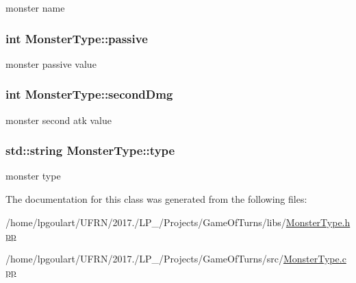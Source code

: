 monster name 

\subsubsection[{\texorpdfstring{passive}{passive}}]{\setlength{\rightskip}{0pt plus 5cm}int Monster\+Type\+::passive\hspace{0.3cm}{\ttfamily [private]}}\hypertarget{classMonsterType_a724fe4488d7b1f3e98acc95cd918d48b}{}\label{classMonsterType_a724fe4488d7b1f3e98acc95cd918d48b}


monster passive value 

\subsubsection[{\texorpdfstring{second\+Dmg}{secondDmg}}]{\setlength{\rightskip}{0pt plus 5cm}int Monster\+Type\+::second\+Dmg\hspace{0.3cm}{\ttfamily [private]}}\hypertarget{classMonsterType_a55aa99c36bbd1d9b9c19bffee306e19b}{}\label{classMonsterType_a55aa99c36bbd1d9b9c19bffee306e19b}


monster second atk value 

\subsubsection[{\texorpdfstring{type}{type}}]{\setlength{\rightskip}{0pt plus 5cm}std\+::string Monster\+Type\+::type\hspace{0.3cm}{\ttfamily [private]}}\hypertarget{classMonsterType_a8f50399e55fb9de06c7a316bf3564cc3}{}\label{classMonsterType_a8f50399e55fb9de06c7a316bf3564cc3}


monster type 



The documentation for this class was generated from the following files\+:\begin{DoxyCompactItemize}
\item 
/home/lpgoulart/\+U\+F\+R\+N/2017./\+L\+P\+\_/\+Projects/\+Game\+Of\+Turns/libs/\hyperlink{MonsterType_8hpp}{Monster\+Type.\+hpp}\item 
/home/lpgoulart/\+U\+F\+R\+N/2017./\+L\+P\+\_/\+Projects/\+Game\+Of\+Turns/src/\hyperlink{MonsterType_8cpp}{Monster\+Type.\+cpp}\end{DoxyCompactItemize}
